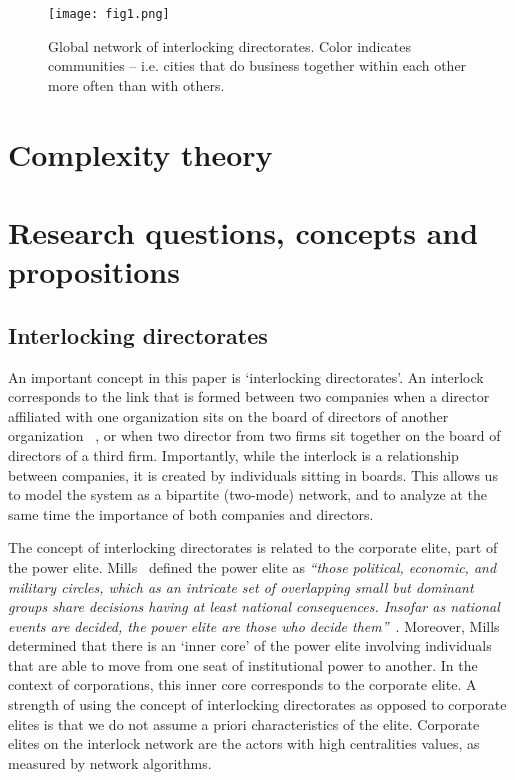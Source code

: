 \begin{figure*}
\begin{center}
\texttt{[image: fig1.png]}
\end{center}
\caption{Global network of interlocking directorates. Color indicates communities -- i.e. cities that do business together within each other more often than with others.}
\label{fig:fig1}
\end{figure*}


\section{Complexity theory}
\label{sec:complexity}


\section{Research questions, concepts and propositions}
\label{sec:question}
\subsection{Interlocking directorates}
An important concept in this paper is `interlocking directorates'. An interlock corresponds to the link that is formed between two companies when a director affiliated with one organization sits on the board of directors of another organization ~\citep{Mizruchi1996}, or when two director from two firms sit together on the board of directors of a third firm. Importantly, while the interlock is a relationship between companies, it is created by individuals sitting in boards. This allows us to model the system as a bipartite (two-mode) network, and to analyze at the same time the importance of both companies and directors.

The concept of interlocking directorates is related to the corporate elite, part of the power elite. Mills~\cite{mills1957} defined the power elite as \textit{``those political, economic, and military circles, which as an intricate set of overlapping small but dominant groups share decisions having at least national consequences. Insofar as national events are decided, the power elite are those who decide them''}~\citep{mills1957}. Moreover, Mills determined that there is an `inner core' of the power elite involving individuals that are able to move from one seat of institutional power to another. In the context of corporations, this inner core corresponds to the corporate elite. A strength of using the concept of interlocking directorates as opposed to corporate elites is that we do not assume a priori characteristics of the elite. Corporate elites on the interlock network are the actors with high centralities values, as measured by network algorithms.

